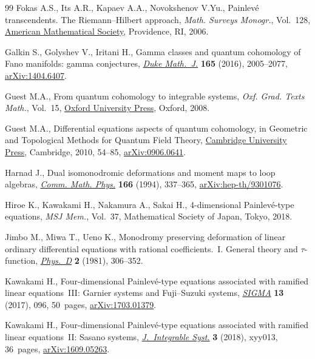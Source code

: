 \documentclass[pdftex]{sigma}
\numberwithin{equation}{section}
\begin{document}
\begin{thebibliography}{99}
Fokas A.S., Its A.R., Kapaev A.A., Novokshenov V.Yu., Painlev\'e transcendents.
 The {R}iemann--{H}ilbert approach, \textit{Math. Surveys Monogr.}, Vol.~128,
 \href{https://doi.org/10.1090/surv/128}{American Mathematical Society}, Providence, RI, 2006.

Galkin S., Golyshev V., Iritani H., Gamma classes and quantum cohomology of
 {F}ano manifolds: gamma conjectures,
 \href{https://doi.org/10.1215/00127094-3476593}{\textit{Duke Math.~J.}}
 \textbf{165} (2016), 2005--2077,
 \href{http://arxiv.org/abs/1404.6407}{arXiv:1404.6407}.

Guest M.A., From quantum cohomology to integrable systems, \textit{Oxf. Grad.
 Texts Math.}, Vol.~15,
 \href{https://doi.org/10.1093/oso/9780198565994.001.0001}{Oxford University
 Press}, Oxford, 2008.

Guest M.A., Differential equations aspects of quantum cohomology, in Geometric
 and {T}opological {M}ethods for {Q}uantum {F}ield {T}heory,
 \href{https://doi.org/10.1017/CBO9780511712135.003}{Cambridge University
 Press}, Cambridge, 2010, 54--85,
 \href{http://arxiv.org/abs/0906.0641}{arXiv:0906.0641}.

Harnad J., Dual isomonodromic deformations and moment maps to loop algebras,
 \href{https://doi.org/10.1007/BF02112319}{\textit{Comm. Math. Phys.}}
 \textbf{166} (1994), 337--365,
 \href{http://arxiv.org/abs/hep-th/9301076}{arXiv:hep-th/9301076}.

Hiroe K., Kawakami H., Nakamura A., Sakai H., 4-dimensional {P}ainlev\'e-type
 equations, \textit{MSJ Mem.}, Vol.~37, Mathematical Society of Japan, Tokyo,
 2018.

Jimbo M., Miwa T., Ueno K., Monodromy preserving deformation of linear ordinary
 differential equations with rational coefficients.~{I}. {G}eneral theory and
 {$\tau $}-function,
 \href{https://doi.org/10.1016/0167-2789(81)90013-0}{\textit{Phys.~D}}
 \textbf{2} (1981), 306--352.

Kawakami H., Four-dimensional {P}ainlev\'e-type equations associated with
 ramified linear equations~{III}: {G}arnier systems and {F}uji--{S}uzuki
 systems, \href{https://doi.org/10.3842/SIGMA.2017.096}{\textit{SIGMA}}
 \textbf{13} (2017), 096, 50~pages,
 \href{http://arxiv.org/abs/1703.01379}{arXiv:1703.01379}.

Kawakami H., Four-dimensional {P}ainlev\'e-type equations associated with
 ramified linear equations~{II}: {S}asano systems,
 \href{https://doi.org/10.1093/integr/xyy013}{\textit{J.~Integrable Syst.}}
 \textbf{3} (2018), xyy013, 36~pages,
 \href{http://arxiv.org/abs/1609.05263}{arXiv:1609.05263}.


\end{thebibliography}
\end{document}
